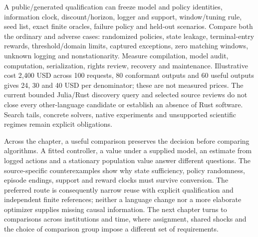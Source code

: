 A public/generated qualification can freeze model and policy identities,
information clock, discount/horizon, logger and support, window/tuning rule,
seed list, exact finite oracles, failure policy and held-out scenarios. Compare
both the ordinary and adverse cases: randomized policies, state leakage,
terminal-entry rewards, threshold/domain limits, captured exceptions, zero
matching windows, unknown logging and nonstationarity. Measure compilation,
model audit, computation, serialization, rights review, recovery and maintenance.
Illustrative cost 2,400 USD across 100 requests, 80 conformant outputs and
60 useful outputs gives 24, 30 and 40 USD per denominator; these are not measured
prices. The current bounded Julia/Rust discovery query and selected source
reviews do not close every other-language candidate or establish an absence
of Rust software. Search tails, concrete solvers, native experiments and
unsupported scientific regimes remain explicit obligations.
\citep{exec24_policyother_contract}

Across the chapter, a useful comparison preserves the decision before comparing
algorithms. A fitted controller, a value under a supplied model, an estimate
from logged actions and a stationary population value answer different
questions. The source-specific counterexamples show why state sufficiency,
policy randomness, episode endings, support and reward clocks must survive
conversion. The preferred route is consequently narrow reuse with explicit
qualification and independent finite references; neither a language change nor
a more elaborate optimizer supplies missing causal information. The next
chapter turns to comparisons across institutions and time, where assignment,
shared shocks and the choice of comparison group impose a different set of
requirements.



